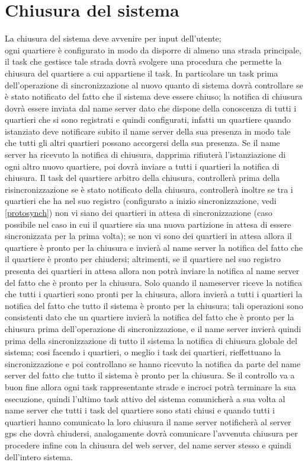 \section{Chiusura del sistema}
La chiusura del sistema deve avvenire per input dell'utente;\\
ogni quartiere è configurato in modo da disporre di almeno una strada
principale, il task che gestisce tale strada dovrà svolgere una procedura che
permette la chiusura del quartiere a cui appartiene il task. In particolare un
task prima dell'operazione di sincronizzazione al nuovo quanto di sistema dovrà
controllare se è stato notificato del fatto che il sistema deve essere chiuso;
la notifica di chiusura dovrà essere inviata dal name server dato che dispone
della conoscenza di tutti i quartieri che si sono registrati e quindi
configurati, infatti un quartiere quando istanziato deve notificare subito il
name server della sua presenza in modo tale che tutti gli altri quartieri
possano accorgersi della sua presenza. Se il name server ha ricevuto la
notifica di chiusura, dapprima rifiuterà l'istanziazione di ogni altro nuovo
quartiere, poi dovrà inviare a tutti i quartieri la notifica di chiusura. Il
task del quartiere arbitro della chiusura, controllerà prima della
risincronizzazione se è stato notificato della chiusura, controllerà inoltre se
tra i quartieri che ha nel suo registro (configurato a inizio sincronizzazione,
vedi \ref{protosynch}) non vi siano dei quartieri in attesa di sincronizzazione
(caso possibile nel caso in cui il quartiere sia una nuova partizione in attesa
di essere sincronizzata per la prima volta); se non vi sono dei quartieri in
attesa allora il quartiere è pronto per la chiusura e invierà al name server la
notifica del fatto che il quartiere è pronto per chiudersi; altrimenti, se il
quartiere nel suo registro presenta dei quartieri in attesa allora non potrà
inviare la notifica al name server del fatto che è pronto per la chiusura. Solo
quando il nameserver riceve la notifica che tutti i quartieri sono pronti per
la chiusura, allora invierà a tutti i quartieri la notifica del fatto che tutto
il sistema è pronto per la chiusura; tali operazioni sono consistenti dato che
un quartiere invierà la notifica del fatto che è pronto per la chiusura prima
dell'operazione di sincronizzazione, e il name server invierà quindi prima
della sincronizzazione di tutto il sistema la notifica di chiusura globale del
sistema; cosi facendo i quartieri, o meglio i task dei quartieri, rieffettuano
la sincronizzazione e poi controllano se hanno ricevuto la notifica da parte
del name server del fatto che tutto il sistema è pronto per la chiusura. Se il
controllo va a buon fine allora ogni task rappresentante strade e incroci potrà
terminare la sua esecuzione, quindi l'ultimo task attivo del sistema comunicherà
a sua volta al name server che tutti i task del quartiere sono stati chiusi e
quando tutti i quartieri hanno comunicato la loro chiusura il name server
notificherà al server gps che dovrà chiudersi, analogamente dovrà comunicare
l'avvenuta chiusura per procedere infine con la chiusura del web server, del
name server stesso e quindi dell'intero sistema.
